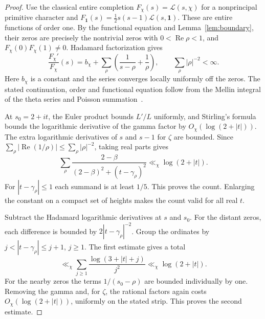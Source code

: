 \documentclass[a4paper,11pt]{article}
\theoremstyle{definition}
\theoremstyle{remark}
\newcommand{\Lh}{\mathcal L}\newcommand{\Gg}{\mathcal G}
\newcommand{\real}{\operatorname{Re}}\newcommand{\imag}{\operatorname{Im}}
\numberwithin{equation}{section}
\begin{document}
\begin{proof}
Use the classical entire completion \(F_\chi(s)=\Lh(s,\chi)\) for a nonprincipal primitive character and \(F_{\mathbf1}(s)=\tfrac12s(s-1)\Lh(s,\mathbf1)\). These are entire functions of order one. By the functional equation and Lemma~\ref{lem:boundary}, their zeros are precisely the nontrivial zeros with \(0<\real\rho<1\), and \(F_\chi(0)F_\chi(1)\ne0\). Hadamard factorization gives
\[
 \frac{F_\chi'}{F_\chi}(s)
   =b_\chi+\sum_\rho\left(\frac1{s-\rho}+\frac1\rho\right),
             \qquad \sum_\rho|\rho|^{-2}<\infty .
\]
Here \(b_\chi\) is a constant and the series converges locally uniformly off the zeros. The stated continuation, order and functional equation follow from the Mellin integral of the theta series and Poisson summation~\cite{I-I-I-nist,I-I-I-elkies}.

At \(s_0=2+it\), the Euler product bounds \(L'/L\) uniformly, and Stirling's formula bounds the logarithmic derivative of the gamma factor by \(O_\chi(\log(2+|t|))\). The extra logarithmic derivatives of \(s\) and \(s-1\) for \(\zeta\) are bounded. Since \(\sum_\rho |\real(1/\rho)|\le\sum_\rho|\rho|^{-2}\), taking real parts gives
\[
     \sum_\rho \frac{2-\beta}{(2-\beta)^2+(t-\gamma_\rho)^2}
                         \ll_\chi\log(2+|t|).
\]
For \(|t-\gamma_\rho|\le1\) each summand is at least \(1/5\). This proves the count. Enlarging the constant on a compact set of heights makes the count valid for all real \(t\).

Subtract the Hadamard logarithmic derivatives at \(s\) and \(s_0\). For the distant zeros, each difference is bounded by \(2|t-\gamma_\rho|^{-2}\). Group the ordinates by \(j<|t-\gamma_\rho|\le j+1\), \(j\ge1\). The first estimate gives a total
\[
       \ll_\chi \sum_{j\ge1}\frac{\log(3+|t|+j)}{j^2}
                   \ll_\chi\log(2+|t|).
\]
For the nearby zeros the terms \(1/(s_0-\rho)\) are bounded individually by one. Removing the gamma and, for \(\zeta\), the rational factors again costs \(O_\chi(\log(2+|t|))\), uniformly on the stated strip. This proves the second estimate.
\end{proof}
\end{document}
